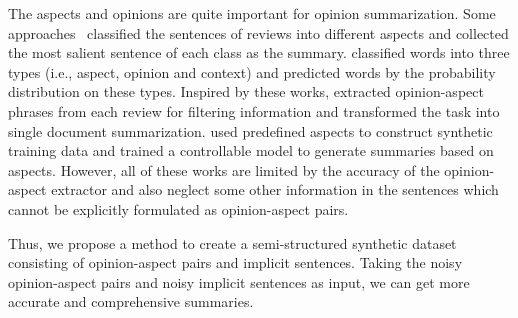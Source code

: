 The aspects and opinions are quite important for opinion summarization.
Some approaches~\cite{AngelidisL18,MukherjeePVGBG20} classified the sentences of reviews into different aspects and collected the most salient sentence of each class as the summary.
\citet{TianY019} 
classified words into three types (i.e., aspect, opinion and context) and predicted words by the probability distribution on these types.
Inspired by these works,
\citet{OpiDig20} extracted opinion-aspect phrases from each review for filtering information and transformed the task into single document summarization. 
\citet{amplayo-etal-2021-aspect} used predefined aspects to construct synthetic training data and trained a controllable model to generate summaries based on aspects.
However, all of these works are limited by the accuracy of 
the opinion-aspect extractor and also
neglect some other information in the sentences which cannot be explicitly formulated as opinion-aspect pairs. 

Thus, we propose a method to create a semi-structured synthetic dataset consisting of
opinion-aspect pairs and implicit sentences. 
Taking the noisy opinion-aspect pairs and noisy implicit sentences as input, we can get more accurate and comprehensive summaries.  

